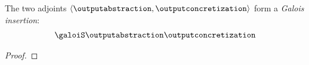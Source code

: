 \begin{theorem}
  The two adjoints $\tuple{\outputabstraction}{\outputconcretization}$ form a \emph{Galois insertion}:
\begin{align*}
  \galoisinjbetweensemantics{dependency}{output}
\end{align*}
\end{theorem}
\begin{proof}


\end{proof}
